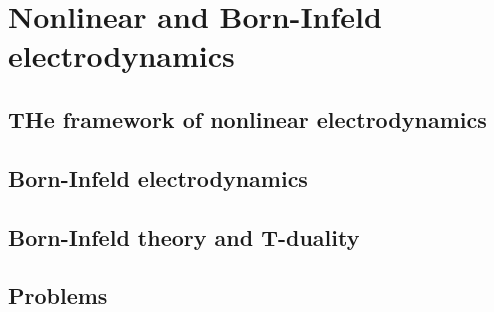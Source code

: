 \documentclass[12pt]{report}
\begin{document}
\chapter{Nonlinear and Born-Infeld electrodynamics}
\newpage
\section{THe framework of nonlinear electrodynamics}
\section{Born-Infeld electrodynamics}
\section{Born-Infeld theory and T-duality}
\section{Problems}
\end{document}
